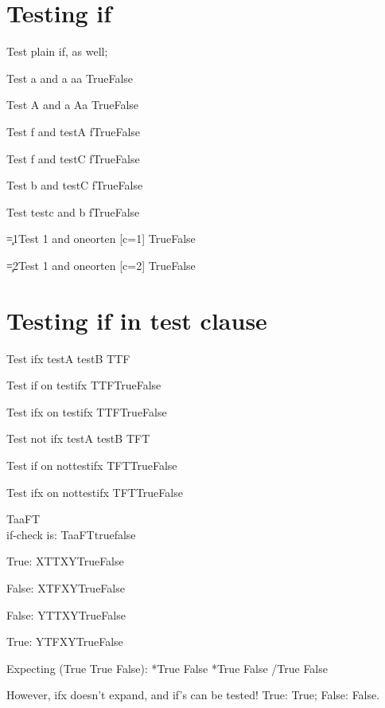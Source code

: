 \documentclass{article}
\begin{document}
\section{Testing if}
Test plain if, as well;

Test a and a \if aa True\else False\fi

Test A and a \if Aa True\else False\fi

Test f and testA \if f\testA True\else False\fi

Test f and testC \if f\testC True\else False\fi

Test b and testC \if f\testC True\else False\fi

Test testc and b  \if f\testC True\else False\fi

\c=1\relax Test 1 and oneorten [c=1]  \oneorten True\else False\fi

\c=2\relax Test 1 and oneorten [c=2]  \oneorten True\else False\fi

\section{Testing if in test clause}
\def\testifx{T\ifx\testA\testB T\else F\fi}

Test ifx testA testB \testifx

Test if on testifx \if\testifx True\else False\fi

Test ifx on testifx \if\testifx True\else False\fi

\def\nottestifx{T\ifx\testA\testB F\else T\fi}

Test not ifx testA testB \nottestifx

Test if on nottestifx \if\nottestifx True\else False\fi

Test ifx on nottestifx \ifx\nottestifx True\else False\fi


\def\a{a}%
 \let\b=\a
 \def\check{T\ifx\a\b F\else T\fi}

 \check\\

 if-check is: \if\check true\else false\fi


\def\innerif{\if\clause X\else Y\fi}

True: \def\clause{TT}\if X\innerif True\else False\fi

False: \def\clause{TF}\if X\innerif True\else False\fi

False: \def\clause{TT}\if Y\innerif True\else False\fi

True: \def\clause{TF}\if Y\innerif True\else False\fi

\def\a{*}
\let\b=*
\def\c{/}

Expecting (True True False):
\if*\a True \else False \fi
\if\a\b True \else False \fi
\if\a\c True \else False \fi

However, ifx doesn't expand, and if's can be tested!
True: \ifx\iftrue\iftrue True\else False\fi;
False: \ifx\iftrue\iffalse True\else False\fi.
\end{document}
